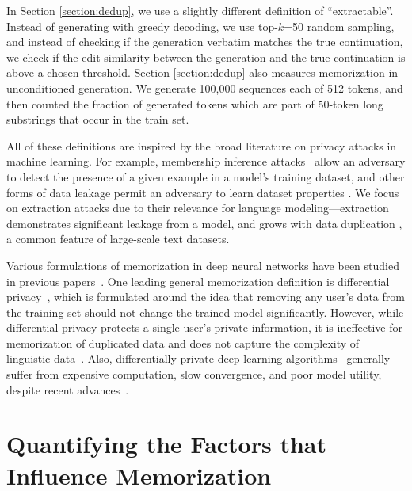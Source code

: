 In Section \ref{section:dedup}, we use a slightly different definition of ``extractable''.
Instead of generating with greedy decoding, we use top-$k$=50 random sampling, and instead of checking if the generation verbatim matches the true continuation, we check if the edit similarity between the generation and the true continuation is above a chosen threshold.
Section \ref{section:dedup} also measures memorization in unconditioned generation.
We generate 100,000 sequences each of 512 tokens, and then counted the fraction of generated tokens which are part of 50-token long substrings that occur in the train set. 

All of these definitions are inspired by the broad literature on privacy attacks in machine learning.
For example, membership inference attacks~\citep{shokri2017membership, yeom2018privacy} allow an adversary to detect the presence of a given example in a model's training dataset, and other forms of data leakage permit an adversary to learn dataset properties \citep{ganju2018property,fredrikson2015model}.
We focus on extraction attacks due to their relevance for language modeling---extraction demonstrates significant leakage from a model, and grows with data duplication \citep{lee2021deduplicating}, a common feature of large-scale text datasets.


Various formulations of memorization in deep neural networks have been studied in previous papers~\citep{carlini2019secret,carlini2020extracting,feldman2020neural,zhang2021counterfactual,colinpaper}. 
One leading general memorization definition is differential privacy~\citep{dwork2006calibrating}, which is formulated around the idea that removing any user's data from the training set should not change the trained model significantly.
However, while differential privacy protects a single user's private information, it is ineffective for memorization of duplicated data and does not capture the complexity of linguistic data~\citep{brown2022does}.
Also, differentially private deep learning algorithms~\citep{abadi2016deep} generally suffer from expensive computation, slow convergence, and poor model utility, despite recent advances~\citep{anil2021large}.


\section{Quantifying the Factors that Influence Memorization}
\label{section:quantifying_memorization}


